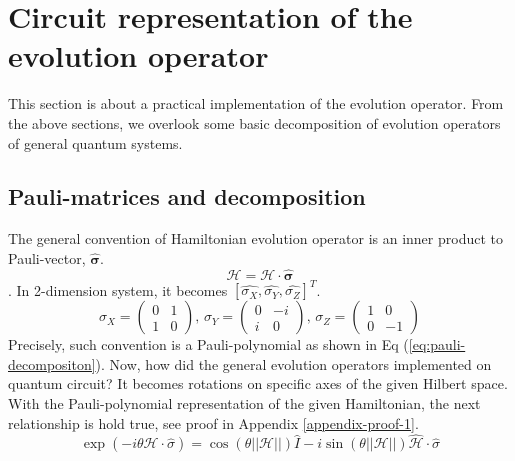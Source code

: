 \section{Circuit representation of the evolution operator}

This section is about a practical implementation of the evolution operator.
From the above sections, we overlook some basic decomposition of 
evolution operators of general quantum systems.

\subsection{Pauli-matrices and decomposition}

The general convention of Hamiltonian evolution operator is 
an inner product to Pauli-vector, $\mathbf{\hat{\sigma}}$.
\begin{equation}
    \mathcal{H} = \mathcal{H} \cdot \mathbf{\hat{\sigma}}
\end{equation}.
In 2-dimension system, it becomes $[\hat{\sigma_X}, \hat{\sigma_Y}, \hat{\sigma_Z}]^T$.
\begin{equation}
    \label{eq:pauli-matrix}
    \sigma_X = \begin{pmatrix}
        0 & 1\\
        1 & 0
    \end{pmatrix}, \,
    \sigma_Y = \begin{pmatrix}
        0 & -i\\
        i & 0
    \end{pmatrix}, \,
    \sigma_Z = \begin{pmatrix}
        1 & 0\\
        0 & -1
    \end{pmatrix}
\end{equation}
Precisely, such convention is a Pauli-polynomial as shown in Eq (\ref{eq:pauli-decompositon}).
Now, how did the general evolution operators implemented on quantum circuit?
It becomes rotations on specific axes of the given Hilbert space.
With the Pauli-polynomial representation of the given Hamiltonian,
the next relationship is hold true, see proof in Appendix \ref{appendix-proof-1}.
\begin{equation}
    \label{eq:hamiltonain-exponential}
    \exp(-i \theta \mathcal{H} \cdot \hat{\sigma}) 
    = \cos(\theta ||\mathcal{H}||) \hat{I} - i \sin(\theta ||\mathcal{H}||) \hat{\mathcal{H}} \cdot \hat{\sigma}
\end{equation}

